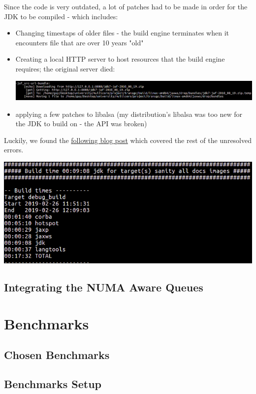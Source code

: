 \documentclass{article}
\begin{document}
  Since the code is very outdated, a lot of patches had to be made in order for the JDK to be compiled - which includes:
  \begin{itemize}
    \item Changing timestaps of older files - the build engine terminates when it encounters file that are over 10 years "old"
    \item Creating a local HTTP server to host resources that the build engine requires; the original server died:

    \includegraphics[width=\textwidth]{local_http_server.png}
    \item applying a few patches to libalsa (my distribution's libalsa was too new for the JDK to build on - the API was broken)
  \end{itemize}

  Luckily, we found the \href{http://www.voidcn.com/article/p-zayqisji-va.html}{following blog post} which covered the rest of the unresolved errors.

  \includegraphics[width=\textwidth]{initial_build.png}

  \newpage

  \subsection{Integrating the NUMA Aware Queues}
  \section{Benchmarks}
  \subsection{Chosen Benchmarks}
  \subsection{Benchmarks Setup}
\end{document}
